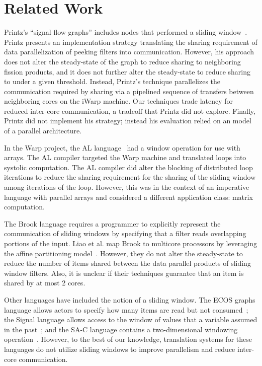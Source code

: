\section{Related Work}


Printz's ``signal flow graphs'' includes nodes that performed a
sliding window~\cite{printz91thesis}.   Printz presents an
implementation strategy translating the sharing requirement of data
parallelization of peeking filters into communication.  However, his
approach does not alter the steady-state of the graph to reduce
sharing to neighboring fission products, and it does not further alter
the steady-state to reduce sharing to under a given threshold.
Instead, Printz's technique parallelizes the communication required
by sharing via a pipelined sequence of transfers between neighboring
cores on the iWarp machine.  Our techniques trade latency for reduced
inter-core communication, a tradeoff that Printz did not explore.
Finally, Printz did not implement his strategy; instead his evaluation
relied on an model of a parallel architecture.

In the Warp project, the AL language~\cite{tseng89thesis,tseng90} had
a window operation for use with arrays.  The AL compiler targeted the
Warp machine and translated loops into systolic computation.  The AL
compiler did alter the blocking of distributed loop iterations to
reduce the sharing requirement for the sharing of the sliding window
among iterations of the loop.  However, this was in the context of an
imperative language with parallel arrays and considered a different
application class: matrix computation. 

The Brook language requires a programmer to explicitly represent the
communication of sliding windows by specifying that a filter reads
overlapping portions of the input. Liao et al. map Brook to multicore
processors by leveraging the affine partitioning
model~\cite{liao06brook}. However, they do not alter the steady-state
to reduce the number of items shared between the data parallel
products of sliding window filters. Also, it is unclear if their
techniques guarantee that an item is shared by at most 2 cores.

Other languages have included the notion of a sliding window.  The ECOS
graphs language allows actors to specify how many items are read but
not consumed~\cite{huang_ecos_1992}; the Signal language allows access
to the window of values that a variable assumed in the
past~\cite{le_guernic_signal--data_1986}; and the SA-C language
contains a two-dimensional windowing
operation~\cite{draper_compiling_2001}.  However, to the best of our
knowledge, translation systems for these languages do not utilize
sliding windows to improve parallelism and reduce inter-core
communication.
